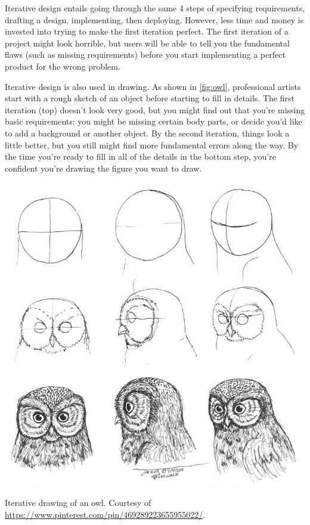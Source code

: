 Iterative design entails going through the same 4 steps of specifying requirements, drafting a design, implementing, then deploying. However, less time and money is invested into trying to make the first iteration perfect. The first iteration of a project might look horrible, but users will be able to tell you the fundamental flaws (such as missing requirements) before you start implementing a perfect product for the wrong problem. 

Iterative design is also used in drawing. As shown in \autoref{fig:owl}, professional artists start with a rough sketch of an object before starting to fill in details. The first iteration (top) doesn't look very good, but you might find out that you're missing basic requirements: you might be missing certain body parts, or decide you'd like to add a background or another object. By the second iteration, things look a little better, but you still might find more fundamental errors along the way. By the time you're ready to fill in all of the details in the bottom step, you're confident you're drawing the figure you want to draw. 

\begin{marginfigure}
	\centering
	\includegraphics[width=\textwidth]{images/owl.jpg}
	\caption[Iterative drawing of an owl]{Iterative drawing of an owl. Courtesy of \url{https://www.pinterest.com/pin/469289223655955022/}.}
	\label{fig:owl}
\end{marginfigure}

